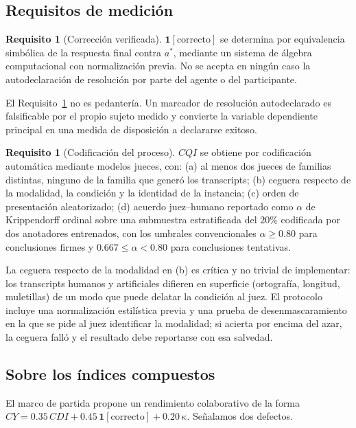 \documentclass[11pt,a4paper]{article}
\theoremstyle{definition}
\newtheorem{requisito}[definicion]{Requisito}
\theoremstyle{plain}
\theoremstyle{remark}
\newcommand{\ind}[1]{\mathbf{1}\!\left[#1\right]}
\begin{document}
\subsection{Requisitos de medición}

\begin{requisito}[Corrección verificada]\label{req:correccion}
$\ind{\text{correcto}}$ se determina por equivalencia simbólica de la respuesta
final contra $a^\ast$, mediante un sistema de álgebra computacional con
normalización previa. No se acepta en ningún caso la autodeclaración de resolución
por parte del agente o del participante.
\end{requisito}

El Requisito~\ref{req:correccion} no es pedantería. Un marcador de resolución
autodeclarado es falsificable por el propio sujeto medido y convierte la variable
dependiente principal en una medida de disposición a declararse exitoso.

\begin{requisito}[Codificación del proceso]\label{req:juez}
$CQI$ se obtiene por codificación automática mediante modelos jueces, con:
(a) al menos dos jueces de familias distintas, ninguno de la familia que generó
los transcripts;
(b) ceguera respecto de la modalidad, la condición y la identidad de la instancia;
(c) orden de presentación aleatorizado;
(d) acuerdo juez--humano reportado como $\alpha$ de Krippendorff ordinal sobre una
submuestra estratificada del $20\%$ codificada por dos anotadores entrenados,
con los umbrales convencionales $\alpha\ge0.80$ para conclusiones firmes y
$0.667\le\alpha<0.80$ para conclusiones tentativas.
\end{requisito}

La ceguera respecto de la modalidad en (b) es crítica y no trivial de implementar:
los transcripts humanos y artificiales difieren en superficie (ortografía,
longitud, muletillas) de un modo que puede delatar la condición al juez. El
protocolo incluye una normalización estilística previa y una prueba de
desenmascaramiento en la que se pide al juez identificar la modalidad; si acierta
por encima del azar, la ceguera falló y el resultado debe reportarse con esa
salvedad.

\subsection{Sobre los índices compuestos}\label{sec:compuesto}

El marco de partida propone un rendimiento colaborativo de la forma
$CY=0.35\,CDI+0.45\,\ind{\text{correcto}}+0.20\,\kappa$. Señalamos dos defectos.
\end{document}
